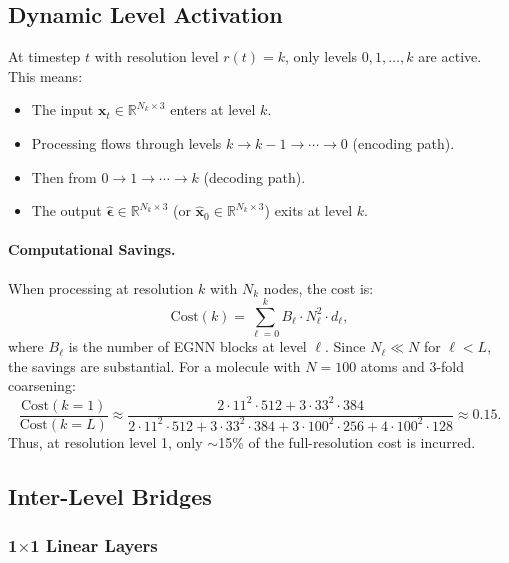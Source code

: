 \documentclass[12pt,a4paper]{article}
\providecommand{\R}{}
\renewcommand{\R}{\mathbb{R}}
\newcommand{\bx}{\bm{x}}
\newcommand{\bep}{\bm{\epsilon}}
\begin{document}
\subsection{Dynamic Level Activation}\label{sec:dynamic_activation}

At timestep $t$ with resolution level $r(t) = k$, only levels $0, 1, \ldots, k$ are active. This means:
\begin{itemize}
    \item The input $\bx_t \in \R^{N_k \times 3}$ enters at level $k$.
    \item Processing flows through levels $k \to k-1 \to \cdots \to 0$ (encoding path).
    \item Then from $0 \to 1 \to \cdots \to k$ (decoding path).
    \item The output $\hat{\bep} \in \R^{N_k \times 3}$ (or $\hat{\bx}_0 \in \R^{N_k \times 3}$) exits at level $k$.
\end{itemize}

\paragraph{Computational Savings.} When processing at resolution $k$ with $N_k$ nodes, the cost is:
\begin{equation}\label{eq:comp_savings}
    \text{Cost}(k) = \sum_{\ell=0}^{k} B_\ell \cdot N_\ell^2 \cdot d_\ell,
\end{equation}
where $B_\ell$ is the number of EGNN blocks at level $\ell$. Since $N_\ell \ll N$ for $\ell < L$, the savings are substantial. For a molecule with $N = 100$ atoms and 3-fold coarsening:
\begin{equation}
    \frac{\text{Cost}(k=1)}{\text{Cost}(k=L)} \approx \frac{2 \cdot 11^2 \cdot 512 + 3 \cdot 33^2 \cdot 384}{2 \cdot 11^2 \cdot 512 + 3 \cdot 33^2 \cdot 384 + 3 \cdot 100^2 \cdot 256 + 4 \cdot 100^2 \cdot 128} \approx 0.15.
\end{equation}
Thus, at resolution level 1, only $\sim$15\% of the full-resolution cost is incurred.

\subsection{Inter-Level Bridges}\label{sec:bridges}

\subsubsection{1$\times$1 Linear Layers}
\end{document}
